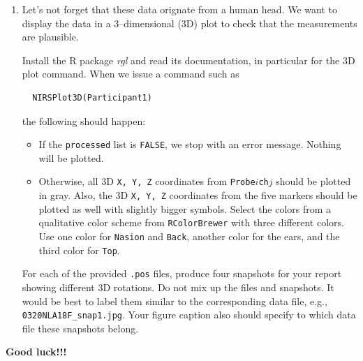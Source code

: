 \documentclass[11pt]{article}
\begin{document}
\begin{enumerate}
\begin{itemize}
\item For the {\tt Sex} field, entries {\tt Female} and {\tt Male} should be 
translated to {\tt F} and {\tt M}, respectively. This should happen, based
on the first letter, i.e., {\tt Femal} still should be translated to {\tt F}.
The same should be done for lower case versions of the genders.
If this field is empty, the {\tt NA}--rule from above applies. If this field
contains anything else that cannot be transformed into {\tt F} or {\tt M},
a warning should be issued and {\tt NA} should be assigned.

\item For the {\tt Age} field, an entry such as ``~~~18y'' simply
should be translated into the number 18.

\item All apparent numbers should be translated into numeric. 
This includes data for the probes, the angles, and several 
variables early in the file. Note that some unusual
data entries exist, e.g., ``--0.0'', which apparently 
should be 0.
\end{itemize}

Extensively test your {\tt NIRSReadPosFile} function.
Also create copies of the data {\tt .pos} files and manipulate
those manually, e.g., by adding or deleting some variables.
You should also modify some of the content to check whether
your error--checking works properly.

\item Let's not forget that these data orignate from a human head.
We want to display the data in a 3--dimensional (3D) plot to check
that the measurements are plausible.

Install the R package {\it rgl} and read its documentation, in particular
for the 3D plot command. When we issue a command such as
\begin{verbatim}
  NIRSPlot3D(Participant1)
\end{verbatim}
the following should happen: 
\begin{itemize}
\item If the {\tt processed} list is {\tt FALSE}, we stop with an error message.
Nothing will be plotted.

\item Otherwise, all 3D {\tt X, Y, Z} coordinates  from {\tt Probe$i$ch$j$}
should be plotted in gray. Also, the 3D {\tt X, Y, Z} coordinates from the 
five markers should be plotted as well with slightly bigger symbols.
Select the colors from a 
qualitative color scheme from {\tt RColorBrewer} with three
different colors. Use one color for {\tt Nasion} and {\tt Back},
another color for the ears, and the third color for {\tt Top}.
\end{itemize}

For each of the provided {\tt .pos} files,
produce four snapshots for your report showing different 3D rotations.
Do not mix up the files and snapshots. It would be best to label
them similar to the corresponding data file, e.g., \verb|0320NLA18F_snap1.jpg|. 
Your figure caption
also should specify to which data file these snapshots belong.
\end{enumerate}


{\large \bf Good luck!!!}
\end{document}
